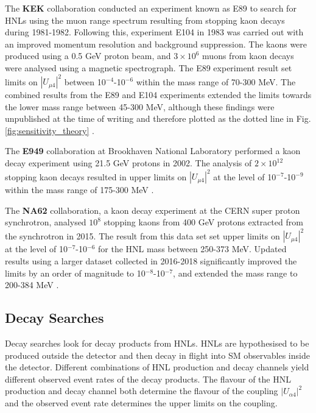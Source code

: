 \begin{coloritemize}
\item The \textbf{KEK} collaboration conducted an experiment known as E89 to search for HNLs using the muon range spectrum resulting from stopping kaon decays during 1981-1982. 
Following this, experiment E104 in 1983 was carried out with an improved momentum resolution and background suppression.
The kaons were produced using a 0.5 GeV proton beam, and $3 \times 10^{6}$ muons from kaon decays were analysed using a magnetic spectrograph.
The E89 experiment result set limits on $|U_{\mu4}|^{2}$ between 10$^{-4}$-10$^{-6}$ within the mass range of 70-300 MeV.
The combined results from the E89 and E104 experiments extended the limits towards the lower mass range between 45-300 MeV, although these findings were unpublished at the time of writing and therefore plotted as the dotted line in Fig. \ref{fig:sensitivity_theory} \cite{KEK1, KEK2, KEK3}.

\item The \textbf{E949} collaboration at Brookhaven National Laboratory performed a kaon decay experiment using 21.5 GeV protons in 2002.
The analysis of $2 \times 10^{12}$ stopping kaon decays resulted in upper limits on $|U_{\mu4}|^{2}$ at the level of 10$^{-7}$-10$^{-9}$ within the mass range of 175-300 MeV \cite{E949}.

\item The \textbf{NA62} collaboration, a kaon decay experiment at the CERN super proton synchrotron, analysed $10^{8}$ stopping kaons from 400 GeV protons extracted from the synchrotron in 2015.
The result from this data set set upper limits on $|U_{\mu4}|^{2}$ at the level of 10$^{-7}$-10$^{-6}$ for the HNL mass between 250-373 MeV.
Updated results using a larger dataset collected in 2016-2018 significantly improved the limits by an order of magnitude to 10$^{-8}$-10$^{-7}$, and extended the mass range to 200-384 MeV \cite{NA62A, NA62B}.
\end{coloritemize}

\subsection{Decay Searches}
\label{sec:decaysearch}

Decay searches look for decay products from HNLs.
HNLs are hypothesised to be produced outside the detector and then decay in flight into SM observables inside the detector.
Different combinations of HNL production and decay channels yield different observed event rates of the decay products.
The flavour of the HNL production and decay channel both determine the flavour of the coupling $|U_{\alpha4}|^2$ and the observed event rate determines the upper limits on the coupling.  

